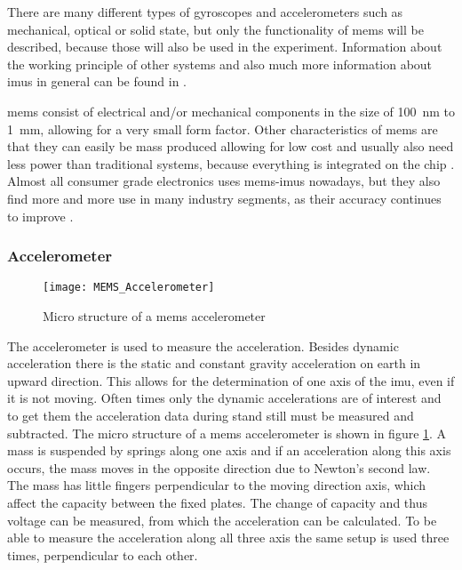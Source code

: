 There are many different types of gyroscopes and accelerometers such as mechanical, optical or solid state, but only the functionality of \gls{mems} will be described, because those will also be used in the experiment.
Information about the working principle of other systems and also much more information about \gls{imu}s in general can be found in \cite{Woodman07anintroduction}.

\gls{mems} consist of electrical and/or mechanical components in the size of \SI{100}{\nano\metre} to \SI{1}{\milli\metre}, allowing for a very small form factor.
Other characteristics of \gls{mems} are that they can easily be mass produced allowing for low cost and usually also need less power than traditional systems, because everything is integrated on the chip \cite{Shaeffer2013}.
Almost all consumer grade electronics uses \gls{mems}-\gls{imu}s nowadays, but they also find more and more use in many industry segments, as their accuracy continues to improve \cite{Perlmutter2016}.


\subsubsection{ Accelerometer}
\begin{figure}[htb]
	\centering
	\texttt{[image: MEMS\_Accelerometer]}
	\caption{Micro structure of a \gls{mems} accelerometer }
	\label{fig:MEMS_Accelerometer}
\end{figure}
The accelerometer is used to measure the acceleration.
Besides dynamic acceleration there is the static and constant gravity acceleration on earth in upward direction.
This allows for the determination of one axis of the \gls{imu}, even if it is not moving.
Often times only the dynamic accelerations are of interest and to get them the acceleration data during stand still must be measured and subtracted.
The micro structure of a \gls{mems} accelerometer is shown in figure \ref{fig:MEMS_Accelerometer}.
A mass is suspended by springs along one axis and if an acceleration along this axis occurs, the mass moves in the opposite direction due to Newton's second law.
The mass has little fingers perpendicular to the moving direction axis, which affect the capacity between the fixed plates.
The change of capacity and thus voltage can be measured, from which the acceleration can be calculated.
To be able to measure the acceleration along all three axis the same setup is used three times, perpendicular to each other.

